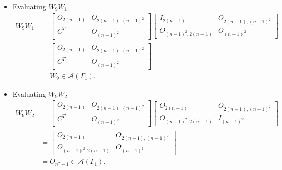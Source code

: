 \begin{itemize}
    \item Evaluating $W_9W_1$
    \begin{align*}
        W_9W_1
        &=\begin{bmatrix}
            O_{2(n-1)} & O_{2(n-1), (n-1)^2} \\
            C^T & O_{(n-1)^2}
        \end{bmatrix}\begin{bmatrix}
            I_{2(n-1)} & O_{2(n-1), (n-1)^2} \\
            O_{(n-1)^2, 2(n-1)} & O_{(n-1)^2}
        \end{bmatrix} \\
        &= \begin{bmatrix}
            O_{2(n-1)} & O_{2(n-1), (n-1)^2} \\
            C^T & O_{(n-1)^2}
        \end{bmatrix}\\
        &= W_9\in\mathcal{A}(\Gamma_1).
    \end{align*}
    
    \item Evaluating $W_9W_2$
    \begin{align*}
        W_9W_2
        &=\begin{bmatrix}
            O_{2(n-1)} & O_{2(n-1), (n-1)^2} \\
            C^T & O_{(n-1)^2}
        \end{bmatrix}\begin{bmatrix}
            O_{2(n-1)} & O_{2(n-1), (n-1)^2} \\
            O_{(n-1)^2, 2(n-1)} & I_{(n-1)^2}
        \end{bmatrix} \\
        &= \begin{bmatrix}
            O_{2(n-1)} & O_{2(n-1), (n-1)^2} \\
            O_{(n-1)^2, 2(n-1)} & O_{(n-1)^2}
        \end{bmatrix}\\
        &= O_{n^2-1}\in\mathcal{A}(\Gamma_1).
    \end{align*}
    

\end{itemize}

